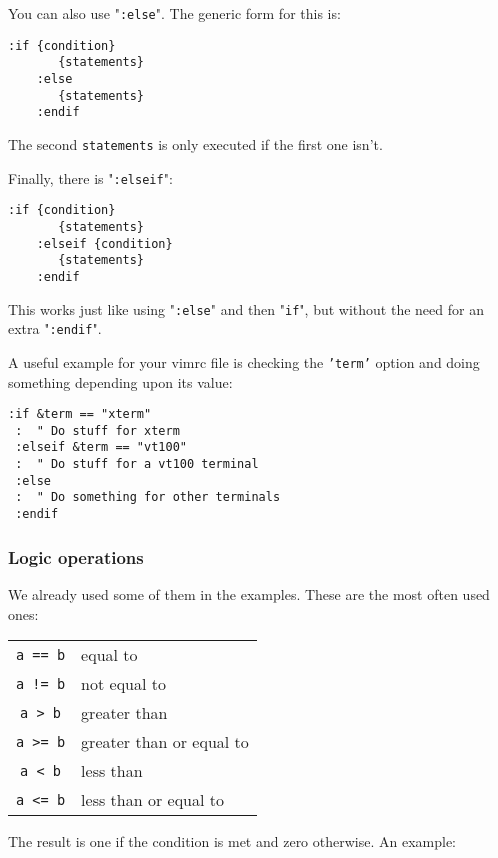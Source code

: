You can also use "\texttt{:else}".
The generic form for this is:

\begin{Verbatim}[samepage=true]
    :if {condition}
       {statements}
    :else
       {statements}
    :endif
\end{Verbatim}

The second \texttt{{statements}} is only executed if the first one isn't.

Finally, there is "\texttt{:elseif}":

\begin{Verbatim}[samepage=true]
    :if {condition}
       {statements}
    :elseif {condition}
       {statements}
    :endif
\end{Verbatim}

This works just like using "\texttt{:else}" and then "\texttt{if}", but without the need for an extra "\texttt{:endif}".

A useful example for your vimrc file is checking the \texttt{'term'} option and doing something depending upon its value:

\begin{Verbatim}[samepage=true]
 :if &term == "xterm"
 :  " Do stuff for xterm
 :elseif &term == "vt100"
 :  " Do stuff for a vt100 terminal
 :else
 :  " Do something for other terminals
 :endif
\end{Verbatim}

\subsubsection{Logic operations}
We already used some of them in the examples.
These are the most often used ones:

\begin{center} \begin{tabular}{c l}
				\texttt{a == b} & equal to \\
				\texttt{a != b} & not equal to \\
				\texttt{a >  b} & greater than \\
				\texttt{a >= b} & greater than or equal to \\
				\texttt{a <  b} & less than \\
				\texttt{a <= b} & less than or equal to \\
\end{tabular} \end{center}

The result is one if the condition is met and zero otherwise.  An example:


